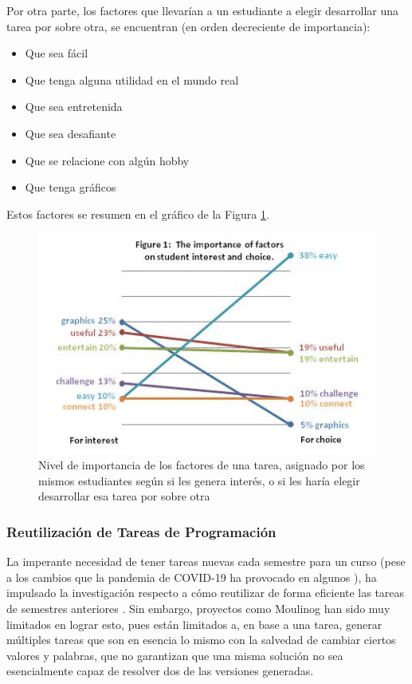 \documentclass[letterpaper,12pt]{article}
\begin{document}
Por otra parte, los factores que llevarían a un estudiante a elegir desarrollar una tarea por sobre otra, se encuentran (en orden decreciente de importancia):

\begin{itemize}
  \item Que sea fácil
  \item Que tenga alguna utilidad en el mundo real
  \item Que sea entretenida
  \item Que sea desafiante
  \item Que se relacione con algún hobby
  \item Que tenga gráficos
\end{itemize}

Estos factores se resumen en el gráfico de la Figura \ref{elecciones}.

\begin{figure}[H]
  \centering
  \includegraphics[width=1\textwidth]{elecciones.png}
  \caption{Nivel de importancia de los factores de una tarea, asignado por los mismos estudiantes según si les genera interés, o si les haría elegir desarrollar esa tarea por sobre otra \cite{10.5555/1968521.1968545}}
  \label{elecciones}
\end{figure}

\subsubsection{Reutilización de Tareas de Programación}

La imperante necesidad de tener tareas nuevas cada semestre para un curso (pese a los cambios que la pandemia de COVID-19 ha provocado en algunos \cite{10.1145/3456565.3461439}), ha impulsado la investigación respecto a cómo reutilizar de forma eficiente las tareas de semestres anteriores \cite{10.1145/3477429}. Sin embargo, proyectos como Moulinog \cite{10.1145/3414080.3414100} han sido muy limitados en lograr esto, pues están limitados a, en base a una tarea, generar múltiples tareas que son en esencia lo mismo con la salvedad de cambiar ciertos valores y palabras, que no garantizan que una misma solución no sea esencialmente capaz de resolver dos de las versiones generadas.
\end{document}
